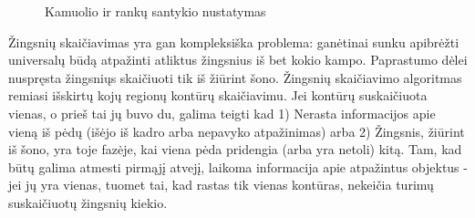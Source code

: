 \documentclass{VUMIFPSbakalaurinis}
\begin{document}
\begin{figure}[H]
	\centering
	\qquad
	\qquad
	\qquad
	\caption{Kamuolio ir rankų santykio nustatymas}
	\label{fig:hand_and_ball}
\end{figure}

Žingsnių skaičiavimas yra gan kompleksiška problema: ganėtinai sunku apibrėžti universalų būdą atpažinti atliktus žingsnius iš bet kokio kampo. Paprastumo dėlei nuspręsta žingsniųs skaičiuoti tik iš žiūrint šono. Žingsnių skaičiavimo algoritmas remiasi išskirtų kojų regionų kontūrų skaičiavimu. Jei kontūrų suskaičiuota vienas, o prieš tai jų buvo du, galima teigti kad 1) Nerasta informacijos apie vieną iš pėdų (išėjo iš kadro arba nepavyko atpažinimas) arba 2) Žingsnis, žiūrint iš šono, yra toje fazėje, kai viena pėda pridengia (arba yra netoli) kitą. Tam, kad būtų galima atmesti pirmąjį atvejį, laikoma informacija apie atpažintus objektus - jei jų yra vienas, tuomet tai, kad rastas tik vienas kontūras, nekeičia turimų suskaičiuotų žingsnių kiekio. 
\end{document}
